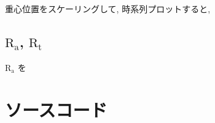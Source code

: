 \documentclass[dvipdfmx]{jsarticle}
\numberwithin{equation}{subsection}
\begin{document}
重心位置をスケーリングして, 時系列プロットすると,



\subsection{$\text{R}_\text{a}$, $\text{R}_\text{t}$}

$\text{R}_\text{a}$ を



\appendix
\section{ソースコード}







\end{document}

